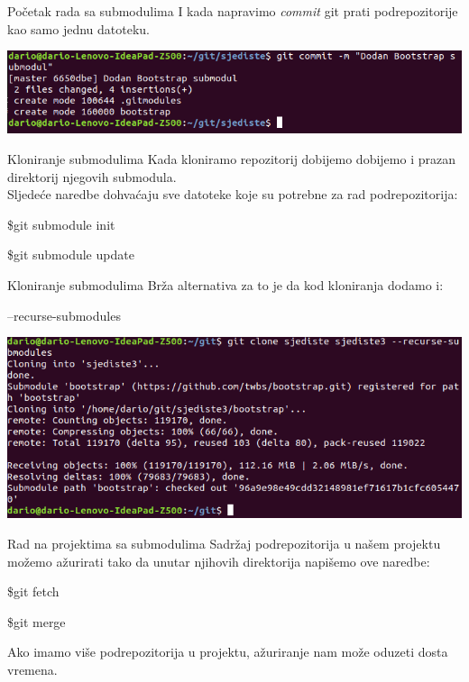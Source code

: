 \documentclass[10pt]{beamer}
\begin{document}
\begin{frame}{Početak rada sa submodulima}
	I kada napravimo \emph{commit} git prati podrepozitorije kao samo jednu datoteku.

	\includegraphics[scale=0.42]{sub_commit}

\end{frame}

\begin{frame}[fragile]{Kloniranje submodulima}
	Kada kloniramo repozitorij dobijemo dobijemo i prazan direktorij njegovih submodula. \\
	Sljedeće naredbe dohvaćaju sve datoteke koje su potrebne za rad podrepozitorija:
	\begin{semiverbatim}\$git submodule init \end{semiverbatim}
	\begin{semiverbatim}\$git submodule update \end{semiverbatim}
\end{frame}

\begin{frame}[fragile]{Kloniranje submodulima}
	Brža alternativa za to je da kod kloniranja dodamo i:
	\begin{semiverbatim} --recurse-submodules\end{semiverbatim}

	\includegraphics[scale=0.42]{sub_recurse}
\end{frame}

\begin{frame}[fragile]{Rad na projektima sa submodulima}
	Sadržaj podrepozitorija u našem projektu možemo ažurirati tako da unutar njihovih direktorija napišemo ove naredbe:
	\begin{semiverbatim}\$git fetch\end{semiverbatim}
	\begin{semiverbatim}\$git merge\end{semiverbatim}
	Ako imamo više podrepozitorija u projektu, ažuriranje nam može oduzeti dosta vremena.
\end{frame}
\end{document}
